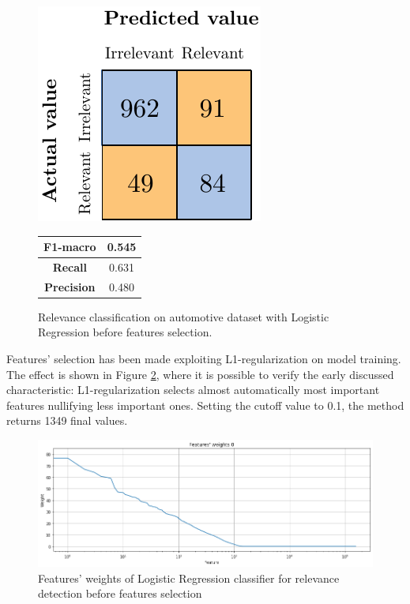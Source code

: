 \begin{figure}[H]
	\begin{minipage}[b]{0.6\linewidth}
		\centering
		\includegraphics[scale=1]{figures/conf_matrices/ita_rel_logreg/ita_rel_logreg_bfs.pdf}
	\end{minipage}
	\begin{minipage}[b]{0.3\linewidth}
		\begin{tabular}[b]{ | c | c | } 
			\hline
			\textbf{F1-macro} & 0.545 \\
			\hline
			\textbf{Recall} & 0.631 \\ 
			\hline
			\textbf{Precision} & 0.480 \\ 
			\hline
		\end{tabular}
	\end{minipage}
	\caption{Relevance classification on automotive dataset with Logistic Regression before features selection.}
	\label{fig:ita_rel_logreg_bfs}
\end{figure}


Features' selection has been made exploiting L1-regularization on model training. The effect is shown in Figure \ref{fig:ita_rel_logreg_fs}, where it is possible to verify the early discussed characteristic: L1-regularization selects almost automatically most important features nullifying less important ones. Setting the cutoff value to 0.1, the method returns 1349 final values.\\

\begin{figure}[H]
	\centering
	\includegraphics[width=\textwidth]{figures/conf_matrices/ita_rel_logreg/ita_rel_logreg_fs.png}
	\caption{Features' weights of Logistic Regression classifier for relevance detection before features selection}
	\label{fig:ita_rel_logreg_fs}
\end{figure}

